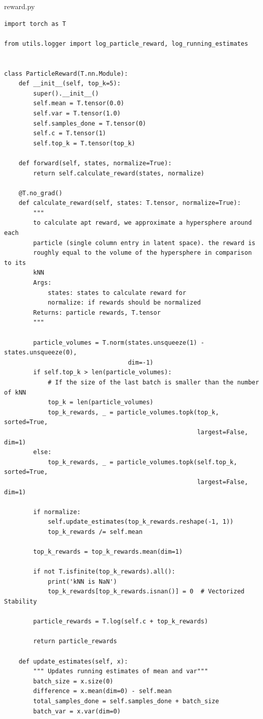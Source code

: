 \documentclass{article}
\begin{document}
reward.py
\begin{lstlisting}
import torch as T

from utils.logger import log_particle_reward, log_running_estimates


class ParticleReward(T.nn.Module):
    def __init__(self, top_k=5):
        super().__init__()
        self.mean = T.tensor(0.0)
        self.var = T.tensor(1.0)
        self.samples_done = T.tensor(0)
        self.c = T.tensor(1)
        self.top_k = T.tensor(top_k)

    def forward(self, states, normalize=True):
        return self.calculate_reward(states, normalize)

    @T.no_grad()
    def calculate_reward(self, states: T.tensor, normalize=True):
        """
        to calculate apt reward, we approximate a hypersphere around each
        particle (single column entry in latent space). the reward is
        roughly equal to the volume of the hypersphere in comparison to its
        kNN
        Args:
            states: states to calculate reward for
            normalize: if rewards should be normalized
        Returns: particle rewards, T.tensor
        """

        particle_volumes = T.norm(states.unsqueeze(1) - states.unsqueeze(0),
                                  dim=-1)
        if self.top_k > len(particle_volumes):
            # If the size of the last batch is smaller than the number of kNN
            top_k = len(particle_volumes)
            top_k_rewards, _ = particle_volumes.topk(top_k, sorted=True,
                                                     largest=False, dim=1)
        else:
            top_k_rewards, _ = particle_volumes.topk(self.top_k, sorted=True,
                                                     largest=False, dim=1)

        if normalize:
            self.update_estimates(top_k_rewards.reshape(-1, 1))
            top_k_rewards /= self.mean

        top_k_rewards = top_k_rewards.mean(dim=1)

        if not T.isfinite(top_k_rewards).all():
            print('kNN is NaN')
            top_k_rewards[top_k_rewards.isnan()] = 0  # Vectorized Stability

        particle_rewards = T.log(self.c + top_k_rewards)

        return particle_rewards

    def update_estimates(self, x):
        """ Updates running estimates of mean and var"""
        batch_size = x.size(0)
        difference = x.mean(dim=0) - self.mean
        total_samples_done = self.samples_done + batch_size
        batch_var = x.var(dim=0)


\end{lstlisting}
\end{document}
